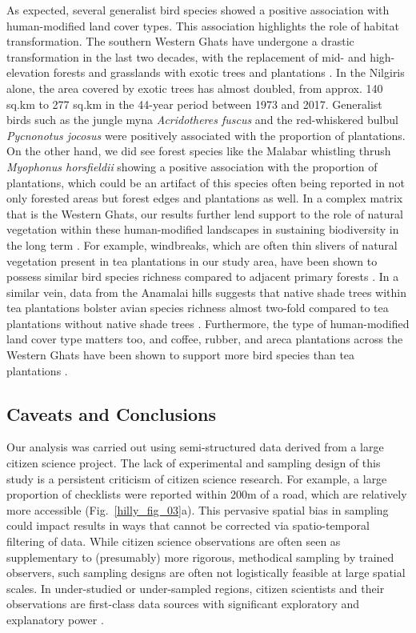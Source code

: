 As expected, several generalist bird species showed a positive association with human-modified land cover types.
This association highlights the role of habitat transformation.
The southern Western Ghats have undergone a drastic transformation in the last two decades, with the replacement of mid- and high-elevation forests and grasslands with exotic trees and plantations \citep{arasumani2018}.
In the Nilgiris alone, the area covered by exotic trees has almost doubled, from approx.
140 sq.km to 277 sq.km in the 44-year period between 1973 and 2017.
Generalist birds such as the jungle myna \textit{Acridotheres fuscus} and the red-whiskered bulbul \textit{Pycnonotus jocosus} were positively associated with the proportion of plantations.
On the other hand, we did see forest species like the Malabar whistling thrush \textit{Myophonus horsfieldii} showing a positive association with the proportion of plantations, which could be an artifact of this species often being reported in not only forested areas but forest edges and plantations as well.
In a complex matrix that is the Western Ghats, our results further lend support to the role of natural vegetation within these human-modified landscapes in sustaining biodiversity in the long term \citep{anand2010,ranganathan2010}.
For example, windbreaks, which are often thin slivers of natural vegetation present in tea plantations in our study area, have been shown to possess similar bird species richness compared to adjacent primary forests \citep{sreekar2013}.
In a similar vein, data from the Anamalai hills suggests that native shade trees within tea plantations bolster avian species richness almost two-fold compared to tea plantations without native shade trees \citep{raman2021}.
Furthermore, the type of human-modified land cover type matters too, and coffee, rubber, and areca plantations across the Western Ghats have been shown to support more bird species than tea plantations \citep{sidhu2010,karanth2016}.

\subsection*{Caveats and Conclusions}

Our analysis was carried out using semi-structured data derived from a large citizen science project.
The lack of experimental and sampling design of this study is a persistent criticism of citizen science research.
For example, a large proportion of checklists were reported within 200m of a road, which are relatively more accessible (Fig.~\ref{hilly_fig_03}a).
This pervasive spatial bias in sampling could impact results in ways that cannot be corrected via spatio-temporal filtering of data.
While citizen science observations are often seen as supplementary to (presumably) more rigorous, methodical sampling by trained observers, such sampling designs are often not logistically feasible at large spatial scales.
In under-studied or under-sampled regions, citizen scientists and their observations are first-class data sources with significant exploratory and explanatory power \citep{devictor2010,ellwood2017,robinson2020}.

